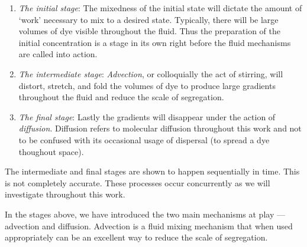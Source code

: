 \begin{enumerate}
\item {\it The initial stage}: The mixedness of the initial state will dictate the amount of `work' necessary to mix to a desired state. Typically, there will be large volumes of dye visible throughout the fluid.  Thus the preparation of the initial concentration is a stage in its own right before the fluid mechanisms are called into action.

\item {\it The intermediate stage}: {\it Advection}, or colloquially the act of stirring, will distort, stretch, and fold the volumes of dye to produce large gradients throughout the fluid and reduce the scale of segregation. 

\item {\it The final stage}: Lastly the gradients will disappear under the action of {\it diffusion}.  Diffusion refers to molecular diffusion throughout this work and not to be confused with its occasional usage of dispersal (to spread a dye thoughout space).  
\end{enumerate}
The intermediate and final stages are shown to happen sequentially in time. This is not completely accurate. These processes occur concurrently as we will investigate throughout this work.

In the stages above, we have introduced the two main mechanisms at play ---  advection and diffusion. Advection is a fluid mixing mechanism that when used appropriately can be an excellent way to reduce the scale of segregation. 

